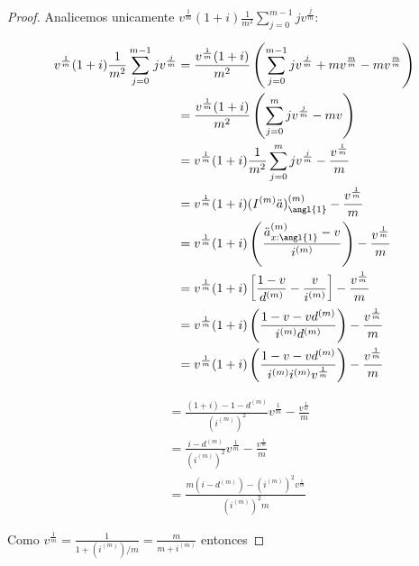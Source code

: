 \begin{proof}
    Analicemos unicamente $v^{\frac{1}{m}} (1 + i) \frac{1}{m^2} \sum_{j=0}^{m-1} j v^{\frac{j}{m}}$:
    
    \begin{align*}
        v^{\frac{1}{m}} (1 + i) \frac{1}{m^2} \sum_{j=0}^{m-1} j v^{\frac{j}{m}} &=\frac{v^{\frac{1}{m}} (1 + i)}{m^2} \left( \sum_{j=0}^{m-1} j v^{\frac{j}{m}} + m v^{\frac{m}{m}} - m v^{\frac{m}{m}} \right)\\
        &= \frac{v^{\frac{1}{m}} (1 + i)}{m^2} \left( \sum_{j=0}^{m} j v^{\frac{j}{m}} - m v \right)\\
        &= v^{\frac{1}{m}} (1 + i) \frac{1}{m^2} \sum_{j=0}^{m} j v^{\frac{j}{m}} - \frac{v^{\frac{1}{m}}}{m}\\
        &= v^{\frac{1}{m}} (1 + i) (I^{(m)}\ddot{a})^{(m)}_\angl{1} - \frac{v^{\frac{1}{m}}}{m}\\
        &= v^{\frac{1}{m}} (1 + i) \left( \frac{\ddot{a}^{(m)}_{x:\angl{1}} - v}{i^{(m)}} \right) - \frac{v^{\frac{1}{m}}}{m}\\
        &= v^{\frac{1}{m}} (1 + i) \left[ \frac{1-v}{d^{(m)}} - \frac{v}{i^{(m)}} \right] - \frac{v^{\frac{1}{m}}}{m}\\
        &= v^{\frac{1}{m}} (1 + i) \left( \frac{1 - v - v d^{(m)}}{i^{(m)}d^{(m)}} \right) - \frac{v^{\frac{1}{m}}}{m}\\
        &= v^{\frac{1}{m}} (1 + i) \left( \frac{1 - v - v d^{(m)}}{i^{(m)}i^{(m)}v^{\frac{1}{m}}} \right) - \frac{v^{\frac{1}{m}}}{m}\\
    \end{align*}

    \begin{align*}
        &= \frac{(1+i) - 1 - d^{(m)}}{(i^{(m)})^2} v^{\frac{1}{m}} - \frac{v^{\frac{1}{m}}}{m}\\
        &= \frac{i - d^{(m)}}{(i^{(m)})^2} v^{\frac{1}{m}} - \frac{v^{\frac{1}{m}}}{m}\\
        &= \frac{m \left( i - d^{(m)} \right) - (i^{(m)})^2 v^{\frac{1}{m}}}{(i^{(m)})^2 m}
    \end{align*}

    Como $v^{\frac{1}{m}} = \frac{1}{1+(i^{(m)})/m} = \frac{m}{m+i^{(m)}}$ entonces


\end{proof}
